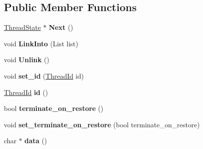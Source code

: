 \subsection*{Public Member Functions}
\begin{DoxyCompactItemize}
\item 
\hypertarget{classv8_1_1internal_1_1_thread_state_a72a0930797cee81d1c9554b85d823a85}{}\hyperlink{classv8_1_1internal_1_1_thread_state}{Thread\+State} $\ast$ {\bfseries Next} ()\label{classv8_1_1internal_1_1_thread_state_a72a0930797cee81d1c9554b85d823a85}

\item 
\hypertarget{classv8_1_1internal_1_1_thread_state_a4defafb5b3668efb14f85d77374bbe3b}{}void {\bfseries Link\+Into} (List list)\label{classv8_1_1internal_1_1_thread_state_a4defafb5b3668efb14f85d77374bbe3b}

\item 
\hypertarget{classv8_1_1internal_1_1_thread_state_a848a04b06e8f8d3007d96f5c5ef92eca}{}void {\bfseries Unlink} ()\label{classv8_1_1internal_1_1_thread_state_a848a04b06e8f8d3007d96f5c5ef92eca}

\item 
\hypertarget{classv8_1_1internal_1_1_thread_state_a29a5b54da6f9f06155d8a1c8757ad6f7}{}void {\bfseries set\+\_\+id} (\hyperlink{classv8_1_1internal_1_1_thread_id}{Thread\+Id} id)\label{classv8_1_1internal_1_1_thread_state_a29a5b54da6f9f06155d8a1c8757ad6f7}

\item 
\hypertarget{classv8_1_1internal_1_1_thread_state_a4ea95e4c29e70027b8f5840cc99c38f0}{}\hyperlink{classv8_1_1internal_1_1_thread_id}{Thread\+Id} {\bfseries id} ()\label{classv8_1_1internal_1_1_thread_state_a4ea95e4c29e70027b8f5840cc99c38f0}

\item 
\hypertarget{classv8_1_1internal_1_1_thread_state_a67d1acd28377f5beca24b338d5d8936e}{}bool {\bfseries terminate\+\_\+on\+\_\+restore} ()\label{classv8_1_1internal_1_1_thread_state_a67d1acd28377f5beca24b338d5d8936e}

\item 
\hypertarget{classv8_1_1internal_1_1_thread_state_a660e8d9c78ff99c0ae245aa2c162851c}{}void {\bfseries set\+\_\+terminate\+\_\+on\+\_\+restore} (bool terminate\+\_\+on\+\_\+restore)\label{classv8_1_1internal_1_1_thread_state_a660e8d9c78ff99c0ae245aa2c162851c}

\item 
\hypertarget{classv8_1_1internal_1_1_thread_state_a12a9a73b486d3393910b402218a10b0d}{}char $\ast$ {\bfseries data} ()\label{classv8_1_1internal_1_1_thread_state_a12a9a73b486d3393910b402218a10b0d}

\end{DoxyCompactItemize}
